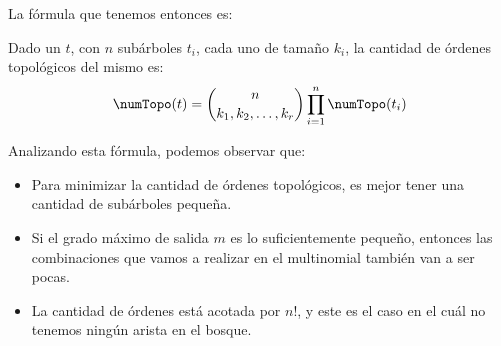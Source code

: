 
La fórmula que tenemos entonces es: 

\begin{definition}\label{for:topoCountingDTrees}
	Dado un \dtree{} $t$, con $n$ subárboles $t_i$, cada uno de tamaño $k_i$, la cantidad de órdenes topológicos del mismo es: 
	\begin{align}
		\numTopo(t) =  \binom{n}{k_1, k_2, \ldots, k_r} \prod_{i=1}^{n} \numTopo(t_i)  
	\end{align}
\end{definition}


Analizando esta fórmula, podemos observar que:

\begin{itemize}
	\item Para minimizar la cantidad de órdenes topológicos, es mejor tener una cantidad de subárboles pequeña. %
	\item Si el grado máximo de salida $m$ es lo suficientemente pequeño, entonces las combinaciones que vamos a realizar en el multinomial también van a ser pocas. %
	
	\item La cantidad de órdenes está acotada por $n!$, y este es el caso en el cuál no tenemos ningún arista en el bosque. 
	
\end{itemize}


